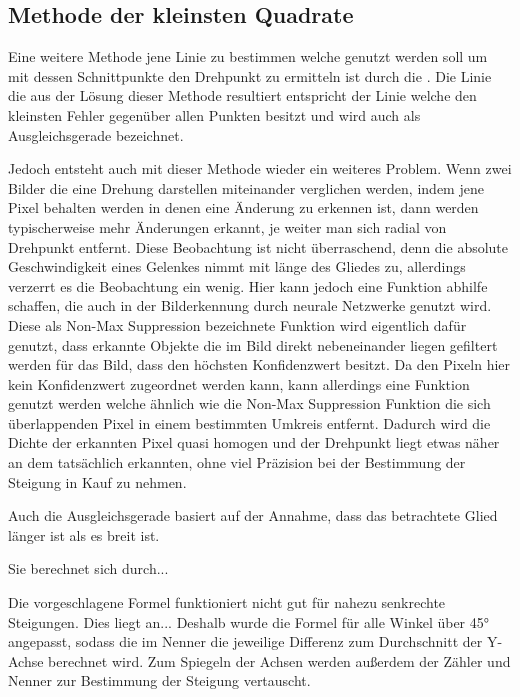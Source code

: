 \subsection{Methode der kleinsten Quadrate}

Eine weitere Methode jene Linie zu bestimmen welche genutzt werden soll um mit dessen Schnittpunkte den Drehpunkt zu ermitteln ist durch die .
Die Linie die aus der Lösung dieser Methode resultiert entspricht der Linie welche den kleinsten Fehler gegenüber allen Punkten besitzt und wird auch als Ausgleichsgerade bezeichnet. %



Jedoch entsteht auch mit dieser Methode wieder ein weiteres Problem.
Wenn zwei Bilder die eine Drehung darstellen miteinander verglichen werden, indem jene Pixel behalten werden in denen eine Änderung zu erkennen ist, dann werden typischerweise mehr Änderungen erkannt, je weiter man sich radial von Drehpunkt entfernt.
Diese Beobachtung ist nicht überraschend, denn die absolute Geschwindigkeit eines Gelenkes nimmt mit länge des Gliedes zu, allerdings verzerrt es die Beobachtung ein wenig.
Hier kann jedoch eine Funktion abhilfe schaffen, die auch in der Bilderkennung durch neurale Netzwerke genutzt wird.
Diese als Non-Max Suppression %
bezeichnete Funktion wird eigentlich dafür genutzt, dass erkannte Objekte die im Bild direkt nebeneinander liegen gefiltert werden für das Bild, dass den höchsten Konfidenzwert besitzt.
Da den Pixeln hier kein Konfidenzwert zugeordnet werden kann, kann allerdings eine Funktion genutzt werden welche ähnlich wie die Non-Max Suppression Funktion %
die sich überlappenden Pixel in einem bestimmten Umkreis entfernt.
Dadurch wird die Dichte der erkannten Pixel quasi homogen und der Drehpunkt liegt etwas näher an dem tatsächlich erkannten, ohne viel Präzision bei der Bestimmung der Steigung in Kauf zu nehmen.



Auch die Ausgleichsgerade basiert auf der Annahme, dass das betrachtete Glied länger ist als es breit ist.

Sie berechnet sich durch... %

Die vorgeschlagene Formel funktioniert nicht gut für nahezu senkrechte Steigungen.
Dies liegt an... %
Deshalb wurde die Formel für alle Winkel über 45° angepasst, sodass die im Nenner die jeweilige Differenz zum Durchschnitt der Y-Achse berechnet wird.
Zum Spiegeln der Achsen werden außerdem der Zähler und Nenner zur Bestimmung der Steigung vertauscht.

